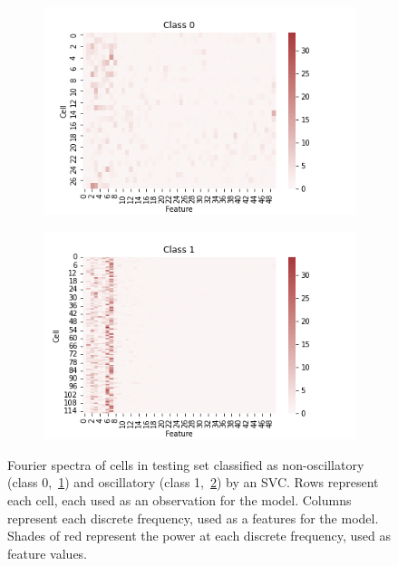\begin{figure}
  \centering
  \begin{subfigure}[htpb]{0.7\textwidth}
   \centering
   \includegraphics[width=\textwidth]{fft_testing_featurevector_0}
   \caption{
   }
   \label{fig:analysis-svc-fft-0}
  \end{subfigure}

  \begin{subfigure}[htpb]{0.7\textwidth}
   \centering
   \includegraphics[width=\textwidth]{fft_testing_featurevector_1}
   \caption{
   }
   \label{fig:analysis-svc-fft-1}
  \end{subfigure}
  \caption[
    Fourier spectra of cells in testing set
  ]{
    Fourier spectra of cells in testing set classified as non-oscillatory (class 0,~\ref{fig:analysis-svc-fft-0}) and oscillatory (class 1,~\ref{fig:analysis-svc-fft-1}) by an SVC.
    Rows represent each cell, each used as an observation for the model.
    Columns represent each discrete frequency, used as a features for the model.
    Shades of red represent the power at each discrete frequency, used as feature values.
  }
  \label{fig:analysis-svc-fft}
\end{figure}



